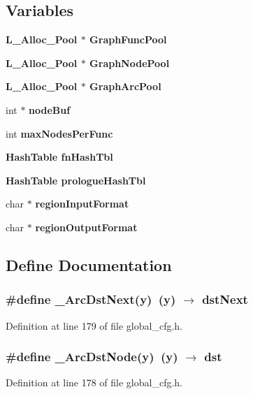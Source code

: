 \subsection*{Variables}
\begin{CompactItemize}
\item 
\bf{L\_\-Alloc\_\-Pool} $\ast$ \bf{Graph\-Func\-Pool}
\item 
\bf{L\_\-Alloc\_\-Pool} $\ast$ \bf{Graph\-Node\-Pool}
\item 
\bf{L\_\-Alloc\_\-Pool} $\ast$ \bf{Graph\-Arc\-Pool}
\item 
int $\ast$ \bf{node\-Buf}
\item 
int \bf{max\-Nodes\-Per\-Func}
\item 
\bf{Hash\-Table} \bf{fn\-Hash\-Tbl}
\item 
\bf{Hash\-Table} \bf{prologue\-Hash\-Tbl}
\item 
char $\ast$ \bf{region\-Input\-Format}
\item 
char $\ast$ \bf{region\-Output\-Format}
\end{CompactItemize}


\subsection{Define Documentation}
\subsubsection{\setlength{\rightskip}{0pt plus 5cm}\#define \_\-Arc\-Dst\-Next(y)~(y) $\rightarrow$ dst\-Next}\label{global__cfg_8h_6984b441cecc5423bd503d6c0ceb2e96}




Definition at line 179 of file global\_\-cfg.h.
\subsubsection{\setlength{\rightskip}{0pt plus 5cm}\#define \_\-Arc\-Dst\-Node(y)~(y) $\rightarrow$ dst}\label{global__cfg_8h_3e5c95dde038e2e6b1e309221356c710}




Definition at line 178 of file global\_\-cfg.h.

